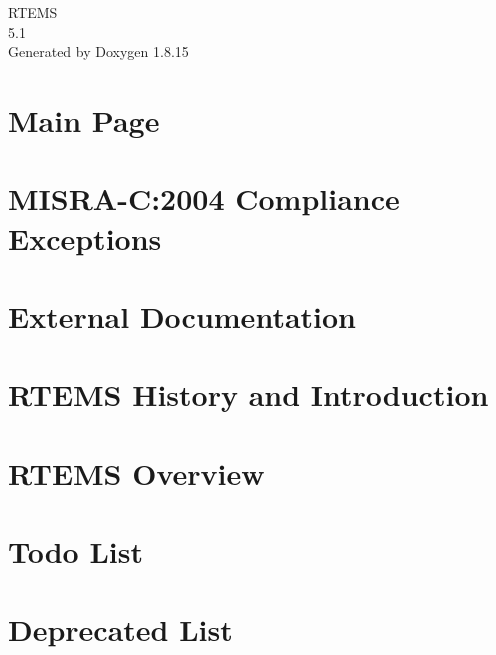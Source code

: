 \let\mypdfximage\pdfximage\def\pdfximage{\immediate\mypdfximage}\documentclass[twoside]{book}
\newcommand{\+}{\discretionary{\mbox{\scriptsize$\hookleftarrow$}}{}{}}
\newcommand{\clearemptydoublepage}{%
  \newpage{\pagestyle{empty}\cleardoublepage}%
}
\begin{document}
\hypersetup{pageanchor=false,
             bookmarksnumbered=true,
             pdfencoding=unicode
            }
\begin{titlepage}
\vspace*{7cm}
\begin{center}%
{\Large R\+T\+E\+MS \\[1ex]\large 5.\+1 }\\
\vspace*{1cm}
{\large Generated by Doxygen 1.8.15}\\
\end{center}
\end{titlepage}
\clearemptydoublepage
{}
\tableofcontents
\clearemptydoublepage
{}
\hypersetup{pageanchor=true}

\chapter{Main Page}
\label{index}\hypertarget{index}{}
\chapter{M\+I\+S\+R\+A-\/C\+:2004 Compliance Exceptions}
\label{CMSIS_MISRA_Exceptions}

\chapter{External Documentation}
\label{mpc55xx_ext_doc}

\chapter{R\+T\+E\+MS History and Introduction}
\label{RTEMSPreface}

\chapter{R\+T\+E\+MS Overview}
\label{RTEMSOverview}

\chapter{Todo List}
\label{todo}

\chapter{Deprecated List}
\label{deprecated}

\end{document}
